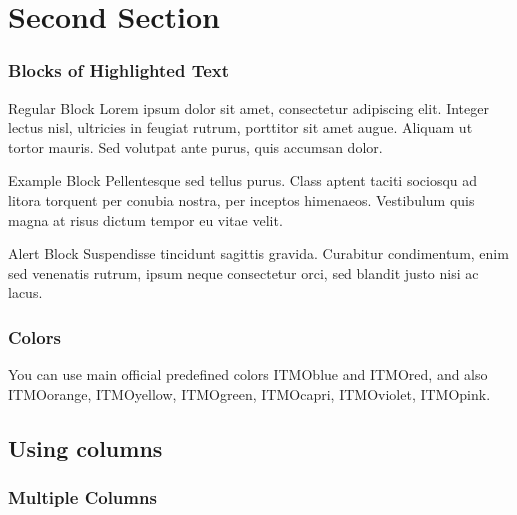 \documentclass[aspectratio=169]{beamer}
\begin{document}
\section{Second Section} 

\begin{frame}
\frametitle{Blocks of Highlighted Text}
\begin{block}{Regular Block}
Lorem ipsum dolor sit amet, consectetur adipiscing elit. Integer lectus nisl, ultricies in feugiat rutrum, porttitor sit amet augue. Aliquam ut tortor mauris. Sed volutpat ante purus, quis accumsan dolor.
\end{block}

\begin{exampleblock}{Example Block}
Pellentesque sed tellus purus. Class aptent taciti sociosqu ad litora torquent per conubia nostra, per inceptos himenaeos. Vestibulum quis magna at risus dictum tempor eu vitae velit.
\end{exampleblock}

\begin{alertblock}{Alert Block}
Suspendisse tincidunt sagittis gravida. Curabitur condimentum, enim sed venenatis rutrum, ipsum neque consectetur orci, sed blandit justo nisi ac lacus.
\end{alertblock}
\end{frame}


\begin{frame}
\frametitle{Colors}

You can use main official predefined colors 
\textcolor{ITMOblue}{ITMOblue} and \textcolor{ITMOred}{ITMOred}, and also
 \textcolor{ITMOorange}{ITMOorange}, \textcolor{ITMOyellow}{ITMOyellow},  \textcolor{ITMOgreen}{ITMOgreen}, \textcolor{ITMOcapri}{ITMOcapri}, \textcolor{ITMOviolet}{ITMOviolet}, \textcolor{ITMOpink}{ITMOpink}.

\end{frame}


\subsection{Using columns}


\begin{frame}
\frametitle{Multiple Columns}
\begin{columns}[c] 



\end{columns}
\end{frame}
\end{document}
